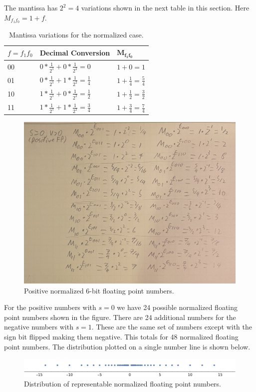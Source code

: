 \documentclass[12pt,letter]{article}
\begin{document}
The mantissa has $2^2=4$ variations shown in the next table in this section. Here $M_{f_1f_0} = 1 + f$.
\begin{table}[h!]
    \centering
\begin{tabular}{l|l|l}
    $f=f_1f_0$ & Decimal Conversion                                        & $\mathbf{M_{f_1f_0}}$             \\ \hline
    00         & $0*\frac{1}{2^1} + 0*\frac{1}{2^2} = 0$                   & $1+0=1$                                   \\
    01         & $0*\frac{1}{2^1} + 1*\frac{1}{2^2} = \frac{1}{4}$         & $1+\frac{1}{4}=\frac{5}{4}$                 \\
    10         & $1*\frac{1}{2^1} + 0*\frac{1}{2^2} = \frac{1}{2}$         & $1+\frac{1}{2}=\frac{3}{2}$                   \\
    11         & $1*\frac{1}{2^1} + 1*\frac{1}{2^2} = \frac{3}{4}$         & $1+\frac{3}{4}=\frac{7}{4}$                 \\
\end{tabular}
\caption{Mantissa variations for the normalized case.}
\label{tab:mant-norm}
\end{table}

\begin{figure}[h]
    \centering
    \includegraphics[scale=0.18]{pos_norm.jpg}
    \caption{Positive normalized 6-bit floating point numbers.}
\end{figure}
For the positive numbers with $s=0$ we have 24 possible normalized floating point numbers shown in the figure. 
There are 24 additional numbers for the negative numbers with $s=1$. These are the same set of numbers except with
the sign bit flipped making them negative. This totals for 48 normalized floating point numbers. The distribution 
plotted on a single number line is shown below.
\begin{figure}[h!]
    \centering
    \includegraphics[scale=0.75]{numberline_norm.png}
    \caption{Distribution of representable normalized floating point numbers.}
\end{figure}
\end{document}
